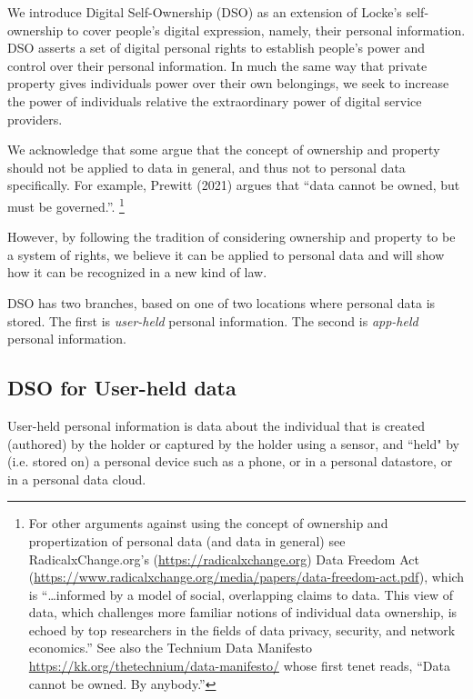 \documentclass[11pt, oneside]{article}   	%
\begin{document}
We introduce Digital Self-Ownership (DSO) as an extension of Locke's self-ownership to cover people's digital expression, namely, their personal information. DSO asserts a set of digital personal rights to establish people's power and control over their personal information. In much the same way that private property gives individuals power over their own belongings, we seek to increase the power of individuals relative the extraordinary power of digital service providers. 

We acknowledge that some argue that the concept of ownership and property should not be applied to data in general, and thus not to personal data specifically. For example, Prewitt (2021) argues that “data cannot be owned, but must be governed.”\cite{Prewitt2021}. \footnote{For other arguments against using the concept of ownership and propertization of personal data (and data in general) see RadicalxChange.org's (\url{https://radicalxchange.org}) Data Freedom Act (\url{https://www.radicalxchange.org/media/papers/data-freedom-act.pdf}), which is “…informed by a model of social, overlapping claims to data. This view of data, which challenges more familiar notions of individual data ownership, is echoed by top researchers in the fields of data privacy, security, and network economics.” See also the Technium Data Manifesto \url{https://kk.org/thetechnium/data-manifesto/} whose first tenet reads, “Data cannot be owned. By anybody.”}

However, by following the tradition of considering ownership and property to be a system of rights, we believe it can be applied to personal data and will show how it can be recognized in a new kind of law.

DSO has two branches, based on one of two locations where personal data is stored. The first is \emph{user-held}\cite{Jurcys2021} personal information. The second is \emph{app-held} personal information. 

\subsection{DSO for User-held data}

User-held personal information is data about the individual that is created (authored) by the holder or captured by the holder using a sensor, and ``held" by (i.e. stored on) a personal device such as a phone, or in a personal datastore, or in a personal data cloud. 
\end{document}
